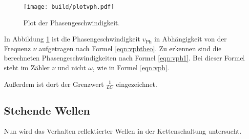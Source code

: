\begin{figure}[h]
  \centering
  \texttt{[image: build/plotvph.pdf]}
  \caption{Plot der Phasengeschwindigkeit.}
  \label{fig:vph}
\end{figure}

In Abbildung \ref{fig:vph} ist die Phasengeschwindigkeit $v_{\text{Ph}}$ in
Abhängigkeit von der Frequenz $\nu$ aufgetragen nach Formel \eqref{eqn:vphtheo}.
 Zu erkennen sind die berechneten
Phasengeschwindigkeiten nach Formel \eqref{eqn:vph1}. Bei dieser Formel steht im
Zähler $\nu$ und nicht $\omega$, wie in Formel \eqref{eqn:vph}.

Außerdem ist dort der Grenzwert $\frac{1}{LC}$ eingezeichnet.
\subsection{Stehende Wellen}

Nun wird das Verhalten reflektierter Wellen in der Kettenschaltung
untersucht.


